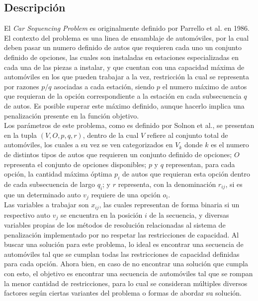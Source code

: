 \documentclass[letter, 10pt]{article}
\begin{document}
\subsection{Descripción}
El \textit{Car Sequencing Problem} es originalmente definido por Parrello et al. en 1986\cite{Parrello_Kabat_Wos_1986}. El contexto del problema es una linea de ensamblaje de automóviles, por la cual deben pasar un numero definido de autos que requieren cada uno un conjunto definido de opciones, las cuales son instaladas en estaciones especializadas en cada una de las piezas a instalar, y que cuentan con una capacidad máxima de automóviles en los que pueden trabajar a la vez, restricción la cual se representa por razones $p/q$ asociadas a cada estación, siendo $p$ el numero máximo de autos que requieran de la opción correspondiente a la estación en cada subsecuencia $q$ de autos. Es posible superar este máximo definido, aunque hacerlo implica una penalización presente en la función objetivo.\\
Los parámetros de este problema, como es definido por Solnon et al.\cite{Solnon_Cung_Nguyen_Artigues_2008}, se presentan en la tupla $(V,O,p,q,r)$, dentro de la cual $V$ refiere al conjunto total de automóviles, los cuales a su vez se ven categorizados en $V_k$ donde $k$ es el numero de distintos tipos de autos que requieren un conjunto definido de opciones; $O$ representa el conjunto de opciones disponibles; $p$ y $q$ representan, para cada opción, la cantidad máxima óptima $p_i$ de autos que requieran esta opción dentro de cada subsecuencia de largo $q_i$; y $r$ representa, con la denominación $r_{ij}$, si es que un determinado auto $v_j$ requiere de una opción $o_i$.\\
Las variables a trabajar son $x_{ij}$, las cuales representan de forma binaria si un respectivo auto $v_j$ se encuentra en la posición $i$ de la secuencia, y diversas variables propias de los métodos de resolución relacionadas al sistema de penalización implementado por no respetar las restricciones de capacidad.
Al buscar una solución para este problema, lo ideal es encontrar una secuencia de automóviles tal que se cumplan todas las restricciones de capacidad definidas para cada opción. Ahora bien, en caso de no encontrar una solución que cumpla con esto, el objetivo es encontrar una secuencia de automóviles tal que se rompan la menor cantidad de restricciones, para lo cual se consideran múltiples diversos factores según ciertas variantes del problema o formas de abordar su solución.
\end{document}
